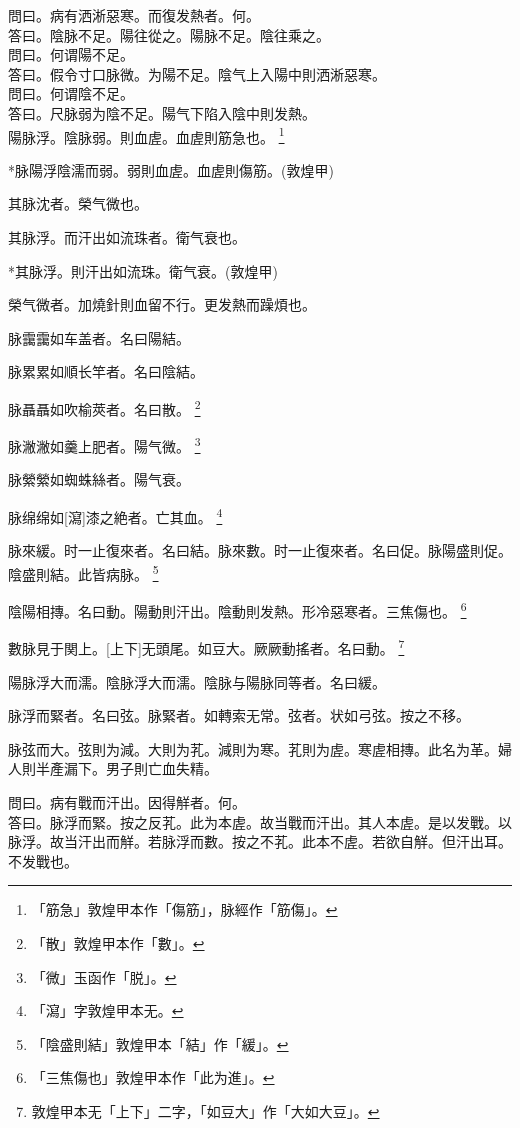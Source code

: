 \documentclass[12pt,twoside,UTF8,b5paper]{ctexbook}
\begin{document}
問曰。病有洒淅惡寒。而復发熱者。何。\\
答曰。陰脉不足。陽往從之。陽脉不足。陰往乘之。\\
問曰。何谓陽不足。\\
答曰。假令寸口脉微。为陽不足。陰气上入陽中則洒淅惡寒。\\
問曰。何谓陰不足。\\
答曰。尺脉弱为陰不足。陽气下陷入陰中則发熱。\\

陽脉浮。陰脉弱。則血虗。血虗則筋急也。
	\footnote{「筋急」敦煌甲本作「傷筋」，脉經作「筋傷」。}

*脉陽浮陰濡而弱。弱則血虗。血虗則傷筋。(敦煌甲)

其脉沈者。榮气微也。

其脉浮。而汗出如流珠者。衛气衰也。

*其脉浮。則汗出如流珠。衛气衰。(敦煌甲)

榮气微者。加燒針則血留不行。更发熱而躁煩也。

脉靄靄如车盖者。名曰陽結。

脉累累如順长竿者。名曰陰結。

脉聶聶如吹榆莢者。名曰散。
	\footnote{「散」敦煌甲本作「數」。}

脉潎潎如羹上肥者。陽气微。
	\footnote{「微」玉函作「脱」。}

脉縈縈如蜘蛛絲者。陽气衰。

脉绵绵如[瀉]漆之絶者。亡其血。
	\footnote{「瀉」字敦煌甲本无。}

脉來緩。时一止復來者。名曰結。脉來數。时一止復來者。名曰促。脉陽盛則促。陰盛則結。此皆病脉。
	\footnote{「陰盛則結」敦煌甲本「結」作「緩」。}

陰陽相摶。名曰動。陽動則汗出。陰動則发熱。形冷惡寒者。三焦傷也。
	\footnote{「三焦傷也」敦煌甲本作「此为進」。}

數脉見于関上。[上下]无頭尾。如豆大。厥厥動搖者。名曰動。
	\footnote{敦煌甲本无「上下」二字，「如豆大」作「大如大豆」。}

陽脉浮大而濡。陰脉浮大而濡。陰脉与陽脉同等者。名曰緩。

脉浮而緊者。名曰弦。脉緊者。如轉索无常。弦者。状如弓弦。按之不移。

脉弦而大。弦則为減。大則为芤。減則为寒。芤則为虗。寒虗相摶。此名为革。婦人則半產漏下。男子則亡血失精。

問曰。病有戰而汗出。因得觧者。何。\\
答曰。脉浮而緊。按之反芤。此为本虗。故当戰而汗出。其人本虗。是以发戰。以脉浮。故当汗出而觧。若脉浮而數。按之不芤。此本不虗。若欲自觧。但汗出耳。不发戰也。
\end{document}
